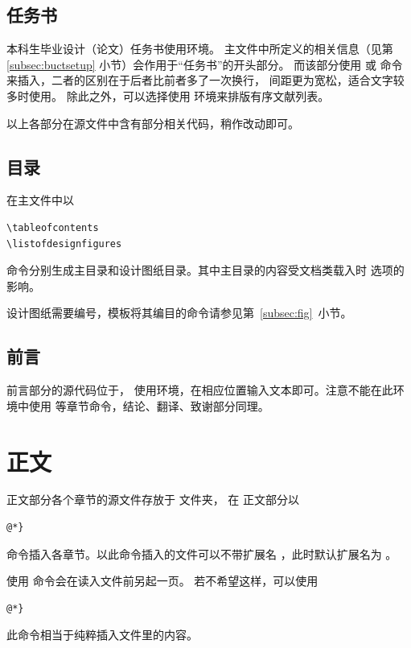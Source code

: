 \subsection{任务书}\label{subsec:taskbook}
本科生毕业设计（论文）任务书使用环境。
主文件中所定义的相关信息（见第 \ref{subsec:buctsetup} 小节）会作用于“任务书”的开头部分。
而该部分使用  或  命令来插入，二者的区别在于后者比前者多了一次换行，
间距更为宽松，适合文字较多时使用。
除此之外，可以选择使用  环境来排版有序文献列表。

以上各部分在源文件中含有部分相关代码，稍作改动即可。

\subsection{目录}\label{subsec:content}
在主文件中以
\begin{lstlisting}[numbers=none]
\tableofcontents
\listofdesignfigures
\end{lstlisting}
命令分别生成主目录和设计图纸目录。其中主目录的内容受文档类载入时  选项的影响。

设计图纸需要编号，模板将其编目的命令请参见第~\ref{subsec:fig}~小节。


\subsection{前言}\label{subsec:foreword}
前言部分的源代码位于，
使用环境，在相应位置输入文本即可。注意不能在此环境中使用
等章节命令，结论、翻译、致谢部分同理。

\section{正文}
正文部分各个章节的源文件存放于  文件夹，
在  正文部分以

\begin{lstlisting}[numbers=none]
@*}
	\end{lstlisting}
命令插入各章节。以此命令插入的文件可以不带扩展名
，此时默认扩展名为 。

使用  命令会在读入文件前另起一页。
若不希望这样，可以使用
\begin{lstlisting}[numbers=none]
@*}
	\end{lstlisting}
此命令相当于纯粹插入文件里的内容。

